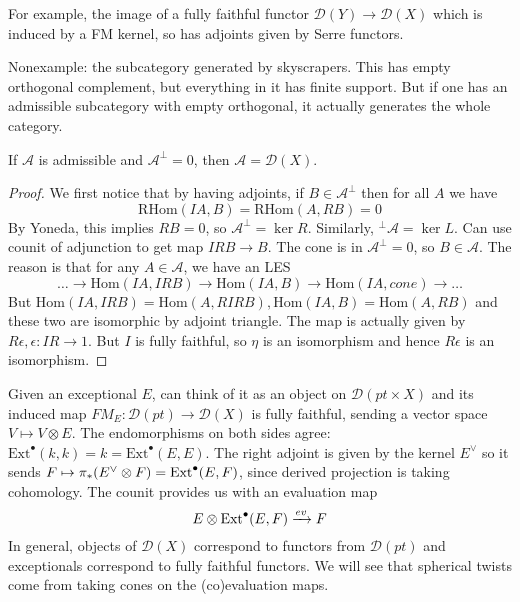 For example, the image of a fully faithful functor $\mathcal{D}(Y)\xrightarrow{}\mathcal{D}(X)$ which is induced by a FM kernel, so has adjoints given by Serre functors.

Nonexample: the subcategory generated by skyscrapers. This has empty orthogonal complement, but everything in it has finite support. But if one has an admissible subcategory with empty orthogonal, it actually generates the whole category.

\begin{proposition}{}{}
    If $\mathcal{A}$ is admissible and $\mathcal{A}^\perp=0$, then $\mathcal{A}=\mathcal{D}(X)$.
\end{proposition}
\begin{proof}[Proof]
    We first notice that by having adjoints, if $B\in\mathcal{A}^\perp$ then for all $A$ we have $$\mathrm{RHom}(IA, B)=\mathrm{RHom}(A,RB)=0$$By Yoneda, this implies $RB=0$, so $\mathcal{A}^\perp = \ker R$. Similarly, $^\perp \mathcal{A}=\ker L.$ Can use counit of adjunction to get map $IRB\xrightarrow{}B$. The cone is in $\mathcal{A}^\perp=0$, so $B\in \mathcal{A}$.  The reason is that for any $A\in \mathcal{A}$, we have an LES $$\dots\xrightarrow{}\mathrm{Hom}(IA, IRB)\xrightarrow{}\mathrm{Hom}(IA, B)\xrightarrow{}\mathrm{Hom}(IA,cone)\xrightarrow{}\dots$$But $\mathrm{Hom}(IA,IRB)=\mathrm{Hom}(A,RIRB), \mathrm{Hom}(IA,B)=\mathrm{Hom}(A,RB)$ and these two are isomorphic by adjoint triangle. The map is actually given by $R\epsilon, \epsilon: IR\xrightarrow{ }1$.  But $I$ is fully faithful, so $\eta$ is an isomorphism and hence $R\epsilon$ is an isomorphism. 
\end{proof}

\begin{remark}{}{}
     Given an exceptional $E$, can think of it as an object on $\mathcal{D}(pt\times X)$ and its induced map $FM_{E}:\mathcal{D}(pt)\xrightarrow{}\mathcal{D}(X)$ is fully faithful, sending a vector space $V\mapsto V\otimes E$. The endomorphisms on both sides agree: $\mathrm{Ext}^\bullet(k,k)=k=\mathrm{Ext}^\bullet(E,E)$. The right adjoint is given by the kernel $E^\lor$ so it sends $F\mapsto \pi_* (E^\lor \otimes F)=\operatorname{Ext}^\bullet(E,F)$, since derived projection is taking cohomology. The counit provides us with an evaluation map $$E\otimes \operatorname{Ext}^\bullet(E,F)\xrightarrow{ev}F$$In general, objects of $\mathcal{D}(X)$ correspond to functors from $\mathcal{D}(pt)$ and exceptionals correspond to fully faithful functors. We will see that spherical twists come from taking cones on the (co)evaluation maps.
\end{remark}


